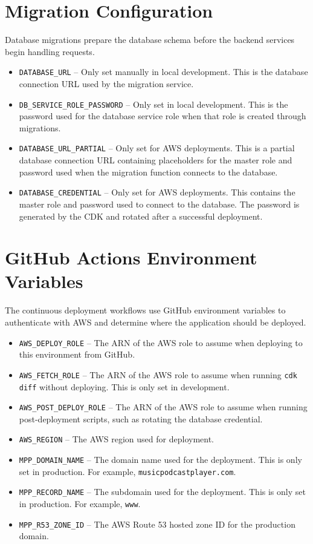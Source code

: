 \documentclass{article}
\begin{document}
\section{Migration Configuration}
Database migrations prepare the database schema before the backend services begin handling requests.
\begin{itemize}
    \item \texttt{DATABASE\_URL} -- Only set manually in local development. This is the database connection URL used by the migration service.
    \item \texttt{DB\_SERVICE\_ROLE\_PASSWORD} -- Only set in local development. This is the password used for the database service role when that role is created through migrations.
    \item \texttt{DATABASE\_URL\_PARTIAL} -- Only set for AWS deployments. This is a partial database connection URL containing placeholders for the master role and password used when the migration function connects to the database.
    \item \texttt{DATABASE\_CREDENTIAL} -- Only set for AWS deployments. This contains the master role and password used to connect to the database. The password is generated by the CDK and rotated after a successful deployment.
\end{itemize}

\section{GitHub Actions Environment Variables}
The continuous deployment workflows use GitHub environment variables to authenticate with AWS and determine where the application should be deployed.
\begin{itemize}
    \item \texttt{AWS\_DEPLOY\_ROLE} -- The ARN of the AWS role to assume when deploying to this environment from GitHub.
    \item \texttt{AWS\_FETCH\_ROLE} -- The ARN of the AWS role to assume when running \texttt{cdk diff} without deploying. This is only set in development.
    \item \texttt{AWS\_POST\_DEPLOY\_ROLE} -- The ARN of the AWS role to assume when running post-deployment scripts, such as rotating the database credential.
    \item \texttt{AWS\_REGION} -- The AWS region used for deployment.
    \item \texttt{MPP\_DOMAIN\_NAME} -- The domain name used for the deployment. This is only set in production. For example, \texttt{musicpodcastplayer.com}.
    \item \texttt{MPP\_RECORD\_NAME} -- The subdomain used for the deployment. This is only set in production. For example, \texttt{www}.
    \item \texttt{MPP\_R53\_ZONE\_ID} -- The AWS Route 53 hosted zone ID for the production domain.
\end{itemize}
\end{document}

